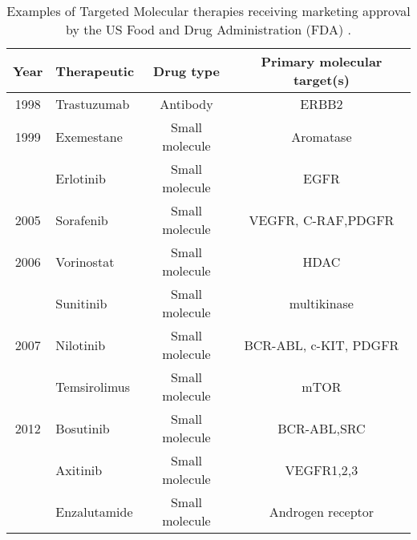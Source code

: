 \begin{table}[h!]
    \caption {Examples of Targeted Molecular therapies receiving marketing approval by the US Food and Drug Administration (FDA) \citep{neidleCancerDrugDesign2014}.}
    \centering
    \footnotesize
    \begin{tabular}{@{}clcc@{}}
    \toprule
    Year & Therapeutic & Drug type & Primary molecular target(s) \\
    \midrule
    1998 & Trastuzumab & Antibody  & ERBB2      \\
    1999 & Exemestane  & Small molecule & Aromatase \\
         & Erlotinib & Small molecule & EGFR\\ 
    2005 & Sorafenib & Small molecule & VEGFR, C-RAF,PDGFR \\
    2006 & Vorinostat & Small molecule & HDAC \\
         & Sunitinib & Small molecule & multikinase \\
    2007 & Nilotinib & Small molecule & BCR-ABL, c-KIT, PDGFR\\ 
         & Temsirolimus & Small molecule & mTOR\\
    2012 & Bosutinib&Small molecule & BCR-ABL,SRC \\  
        &Axitinib &Small molecule &VEGFR1,2,3 \\ 
        &Enzalutamide &Small molecule &Androgen receptor \\ 
    \bottomrule
    \end{tabular}
    \label{table2.1}
\end{table}